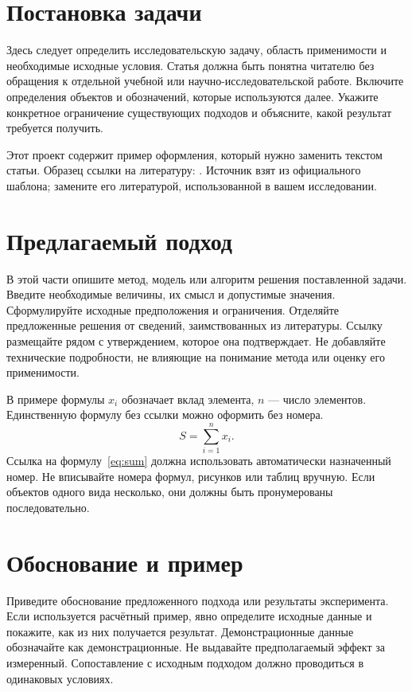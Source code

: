 \section{Постановка задачи}
Здесь следует определить исследовательскую задачу, область применимости и
необходимые исходные условия. Статья должна быть понятна читателю без обращения
к отдельной учебной или научно-исследовательской работе. Включите определения
объектов и обозначений, которые используются далее. Укажите конкретное
ограничение существующих подходов и объясните, какой результат требуется получить.

Этот проект содержит пример оформления, который нужно заменить текстом статьи.
Образец ссылки на литературу: \cite{sample}. Источник взят из официального
шаблона; замените его литературой, использованной в вашем исследовании.

\section{Предлагаемый подход}
В этой части опишите метод, модель или алгоритм решения поставленной задачи.
Введите необходимые величины, их смысл и допустимые значения. Сформулируйте
исходные предположения и ограничения. Отделяйте предложенные решения от сведений,
заимствованных из литературы. Ссылку размещайте рядом с утверждением, которое
она подтверждает. Не добавляйте технические подробности, не влияющие на понимание
метода или оценку его применимости.

В примере формулы $x_i$ обозначает вклад элемента, $n$ --- число элементов.
Единственную формулу без ссылки можно оформить без номера.
\begin{equation}
  S = \sum_{i=1}^{n} x_i .
  \label{eq:sum}
\end{equation}
Ссылка на формулу~\eqref{eq:sum} должна использовать автоматически назначенный
номер. Не вписывайте номера формул, рисунков или таблиц вручную. Если объектов
одного вида несколько, они должны быть пронумерованы последовательно.

\section{Обоснование и пример}
Приведите обоснование предложенного подхода или результаты эксперимента.
Если используется расчётный пример, явно определите исходные данные и
покажите, как из них получается результат. Демонстрационные данные обозначайте
как демонстрационные. Не выдавайте предполагаемый эффект за измеренный.
Сопоставление с исходным подходом должно проводиться в одинаковых условиях.

